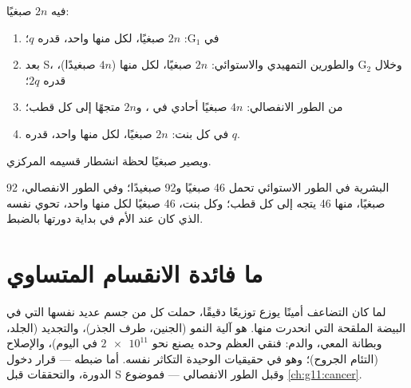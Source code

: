 \begin{method}\label{met:g11:cell-cycle-mitosis:counting}
 فيه $2n$ صبغيًا:
\begin{enumerate}
  \item في $\mathrm{G_1}$: $2n$ صبغيًا، لكل منها  واحد، 
        قدره $q$؛
  \item بعد S، وخلال $\mathrm{G_2}$ والطورين التمهيدي والاستوائي:
        $2n$ صبغيًا، لكل منها  ($4n$ صبغيدًا)،  قدره $2q$؛
  \item من الطور الانفصالي: $4n$ صبغيًا أحادي  في ،
        و$2n$ متجهًا إلى كل قطب؛
  \item في كل  بنت: $2n$ صبغيًا، لكل منها  واحد،  قدره
        $q$.
\end{enumerate}
ويصير  صبغيًا لحظة انشطار قسيمه المركزي.
\end{method}

\begin{example}\label{ex:g11:cell-cycle-mitosis:human}
 البشرية في الطور الاستوائي تحمل 46 صبغيًا و92 صبغيدًا؛ وفي
الطور الانفصالي، 92 صبغيًا، منها 46 يتجه إلى كل قطب؛ وكل بنت، 46
صبغيًا لكل منها  واحد، تحوي  نفسه الذي كان عند الأم في بداية
دورتها بالضبط.
\end{example}

\section{ما فائدة الانقسام المتساوي}

\begin{proposition}\label{prop:g11:cell-cycle-mitosis:conformity}
لما كان التضاعف أمينًا  يوزع  توزيعًا
دقيقًا، حملت كل  من جسم عديد   نفسها التي
في البيضة الملقحة التي انحدرت منها.  هو آلية النمو
(الجنين، طرف الجذر)، والتجديد (الجلد، وبطانة المعي، والدم: فنقي العظم
وحده يصنع نحو $\num{2e11}$  في اليوم)، والإصلاح (التئام الجروح)؛
وهو في حقيقيات  الوحيدة  التكاثر نفسه. أما ضبطه --- قرار
دخول الدورة، والتحققات قبل S وقبل الطور الانفصالي --- فموضوع
\cref{ch:g11:cancer}.
\end{proposition}
\admitted

